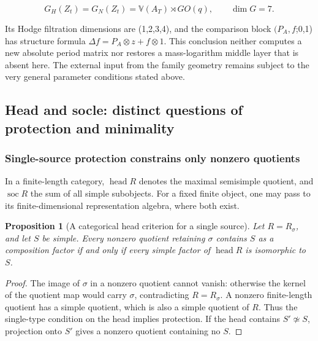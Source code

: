\documentclass[11pt,a4paper,oneside]{article}
\theoremstyle{plain}
\newtheorem{proposition}[theorem]{Proposition}
\theoremstyle{definition}
\theoremstyle{remark}
\newcommand{\Q}{\mathbb Q}
\newcommand{\C}{\mathbb C}
\newcommand{\End}{\operatorname{End}}
\newcommand{\Hom}{\operatorname{Hom}}
\newcommand{\rank}{\operatorname{rank}}
\newcommand{\im}{\operatorname{im}}
\newcommand{\id}{\operatorname{id}}
\newcommand{\dR}{\mathrm{dR}}
\numberwithin{equation}{section}
\begin{document}
\begin{equation}
G_H(Z_t)=G_N(Z_t)=\mathbb V(A_T)\rtimes GO(q),
                    \qquad\dim G=7.
\end{equation}

Its Hodge filtration dimensions are (1,2,3,4), and the comparison block \((P_A,f\);0,1) has structure formula \(\Delta f=P_A\otimes z+f\otimes 1\). This conclusion neither computes a new absolute period matrix nor restores a mass-logarithm middle layer that is absent here. The external input from the family geometry remains subject to the very general parameter conditions stated above.



\endgroup

\begingroup
\providecommand{\Q}{\mathbb Q}
\providecommand{\C}{\mathbb C}
\providecommand{\dR}{\mathrm{dR}}
\providecommand{\id}{\operatorname{id}}
\providecommand{\im}{\operatorname{im}}
\providecommand{\End}{\operatorname{End}}
\providecommand{\Hom}{\operatorname{Hom}}
\providecommand{\Vis}{\operatorname{Vis}}
\providecommand{\soc}{\operatorname{soc}}
\providecommand{\head}{\operatorname{head}}
\providecommand{\rank}{\operatorname{rank}}
\subsection{Head and socle: distinct questions of protection and minimality}
\subsubsection{Single-source protection constrains only nonzero quotients}
In a finite-length category, $\head R$ denotes the maximal semisimple quotient,
and $\soc R$ the sum of all simple subobjects. For a fixed finite object, one may pass to its finite-dimensional representation algebra,
where both exist.

\begin{proposition}[A categorical head criterion for a single source]\label{ops:prop:head}
Let $R=R_\sigma$, and let $S$ be simple.
Every nonzero quotient retaining $\sigma$ contains $S$ as a composition factor
if and only if every simple factor of $\head R$ is isomorphic to $S$.
\end{proposition}
\begin{proof}
The image of $\sigma$ in a nonzero quotient cannot vanish: otherwise the kernel of the quotient map would carry $\sigma$,
contradicting $R=R_\sigma$. A nonzero finite-length quotient has a simple quotient,
which is also a simple quotient of $R$. Thus the single-type condition on the head implies protection.
If the head contains $S'\not\simeq S$, projection onto $S'$ gives a nonzero quotient containing no $S$.
\end{proof}
\end{document}

